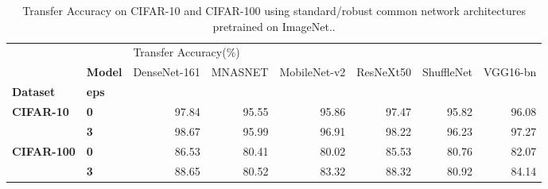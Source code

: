 \begin{table}
\centering
\caption{Transfer Accuracy on CIFAR-10 and CIFAR-100 using standard/robust common network architectures pretrained on ImageNet..}
\label{table:transfer-vary-arch}
\begin{tabular}{llrrrrrr}
\toprule
          & {} & \multicolumn{6}{l}{Transfer Accuracy(\%)} \\
          & \textbf{Model} &         DenseNet-161 & MNASNET & MobileNet-v2 & ResNeXt50 & ShuffleNet & VGG16-bn \\
\textbf{Dataset} & \textbf{eps} &                      &         &              &           &            &          \\
\midrule
\multirow{2}{*}{\textbf{CIFAR-10}} & \textbf{0} &                97.84 &   95.55 &        95.86 &     97.47 &      95.82 &    96.08 \\
          & \textbf{3} &                98.67 &   95.99 &        96.91 &     98.22 &      96.23 &    97.27 \\
\cline{1-8}
\multirow{2}{*}{\textbf{CIFAR-100}} & \textbf{0} &                86.53 &   80.41 &        80.02 &     85.53 &      80.76 &    82.07 \\
          & \textbf{3} &                88.65 &   80.52 &        83.32 &     88.32 &      80.92 &    84.14 \\
\bottomrule
\end{tabular}
\end{table}
